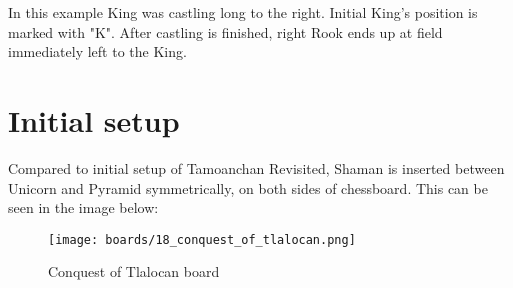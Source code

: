 In this example King was castling long to the right. Initial King's position is marked with "K".
After castling is finished, right Rook ends up at field immediately left to the King.

\clearpage %

\section*{Initial setup}

Compared to initial setup of Tamoanchan Revisited, Shaman is inserted between Unicorn and Pyramid
symmetrically, on both sides of chessboard. This can be seen in the image below:

\noindent
\begin{figure}[h]
\texttt{[image: boards/18\_conquest\_of\_tlalocan.png]}
\caption{Conquest of Tlalocan board}
\label{fig:18_conquest_of_tlalocan}
\end{figure}

\clearpage %
